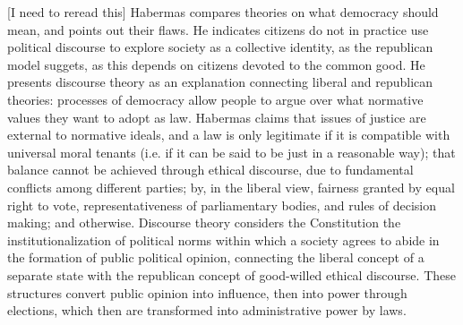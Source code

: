 [I need to reread this] Habermas compares theories on what democracy should mean, and points out their flaws.  He indicates citizens do not in practice use political discourse to explore society as a collective identity, as the republican model suggets, as this depends on citizens devoted to the common good.  He presents discourse theory as an explanation connecting liberal and republican theories:  processes of democracy allow people to argue over what normative values they want to adopt as law.  Habermas claims that issues of justice are external to normative ideals, and a law is only legitimate if it is compatible with universal moral tenants (i.e. if it can be said to be just in a reasonable way); that balance cannot be achieved through ethical discourse, due to fundamental conflicts among different parties; by, in the liberal view, fairness granted by equal right to vote, representativeness of parliamentary bodies, and rules of decision making; and otherwise.  Discourse theory considers the Constitution the institutionalization of political norms within which a society agrees to abide in the formation of public political opinion, connecting the liberal concept of a separate state with the republican concept of good-willed ethical discourse.  These structures convert public opinion into influence, then into power through elections, which then are transformed into administrative power by laws.


%
